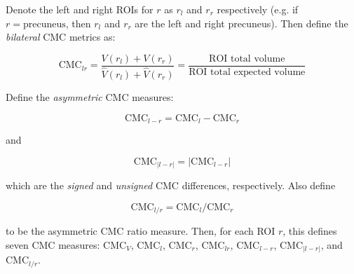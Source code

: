 \documentclass{article}
\newcommand{\note}[2][cyan]{\textbf{NOTE}: \textcolor{#1}{#2}}
\begin{document}


Denote the left and right ROIs for \(r\) as \(r_l\) and \(r_r\) respectively
(e.g\@. if \(r=\text{precuneus}\), then \(r_l\) and \(r_r\) are the left and
right precuneus). Then define the \emph{bilateral} CMC metrics as:

\begin{equation} \label{eq:cmc-bilateral}
\text{CMC}_{lr}
=\frac{V(r_l) + V(r_r)}{\hat{V}(r_l) + \hat{V}(r_r)}
=\frac{\text{ROI total volume}}{\text{ROI total expected volume}}
\end{equation}

Define the \emph{asymmetric} CMC measures:

%

\begin{equation} \label{eq:asym-signed-diff}
\text{CMC}_{l - r} = \text{CMC}_{l} - \text{CMC}_{r}
\end{equation}

and

\begin{equation} \label{eq:asym-unsigned-diff}
\text{CMC}_{|l - r|} = \lvert\text{CMC}_{l - r} \rvert
\end{equation}

which are the \emph{signed} and \emph{unsigned} CMC differences, respectively. Also define

\begin{equation} \label{eq:asym-ratio}
\text{CMC}_{l / r} = \text{CMC}_{l} / \text{CMC}_{r}
\end{equation}

to be the asymmetric CMC ratio measure. Then, for each ROI \(r\), this
defines seven \(\text{CMC}\) measures: \(\text{CMC}_{V}\), \(\text{CMC}_l\),
\(\text{CMC}_r\), \(\text{CMC}_{lr}\), \(\text{CMC}_{l-r}\),
\(\text{CMC}_{\lvert l-r \rvert}\), and \(\text{CMC}_{l / r}\).


%
%
\end{document}
